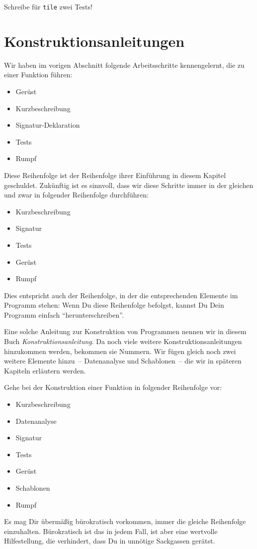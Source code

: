 \begin{aufgabe}
  Schreibe für \texttt{tile} zwei Tests!
\end{aufgabe}

\section{Konstruktionsanleitungen}
%
Wir haben im vorigen Abschnitt folgende Arbeitsschritte kennengelernt,
die zu einer Funktion führen:
%
\begin{itemize}
\item Gerüst
\item Kurzbeschreibung
\item Signatur-Deklaration
\item Tests
\item Rumpf
\end{itemize}
%
Diese Reihenfolge ist der Reihenfolge ihrer Einführung in diesem
Kapitel geschuldet.  Zukünftig ist es sinnvoll, dass wir diese Schritte
immer in der gleichen und zwar in folgender Reihenfolge durchführen:
%
\begin{itemize}
\item Kurzbeschreibung
\item Signatur
\item Tests
\item Gerüst
\item Rumpf
\end{itemize}
%
Dies entspricht auch der Reihenfolge, in der die entsprechenden
Elemente im Programm stehen: Wenn Du diese Reihenfolge befolgst,
kannst Du Dein Programm einfach "`herunterschreiben"'.

Eine solche Anleitung zur Konstruktion von Programmen nennen wir in
diesem Buch
\textit{Konstruktionsanleitung}.  Da
noch viele weitere Konstruktionsanleitungen hinzukommen werden,
bekommen sie Nummern.  Wir fügen gleich noch zwei weitere Elemente
hinzu~-- Datenanalyse und Schablonen~-- die wir in späteren Kapiteln
erläutern werden.

\begin{konstruktionsanleitung}[Ablauf]
  Gehe bei der Konstruktion einer Funktion in folgender Reihenfolge
  vor:
  \begin{itemize}
    \item Kurzbeschreibung
    \item Datenanalyse
    \item Signatur
    \item Tests
    \item Gerüst
    \item Schablonen
    \item Rumpf
    \end{itemize}
\end{konstruktionsanleitung}
%
Es mag Dir übermäßig bürokratisch vorkommen, immer die gleiche
Reihenfolge einzuhalten.  Bürokratisch ist das in jedem Fall, ist aber
eine wertvolle Hilfestellung, die verhindert, dass Du in unnötige
Sackgassen gerätst.

